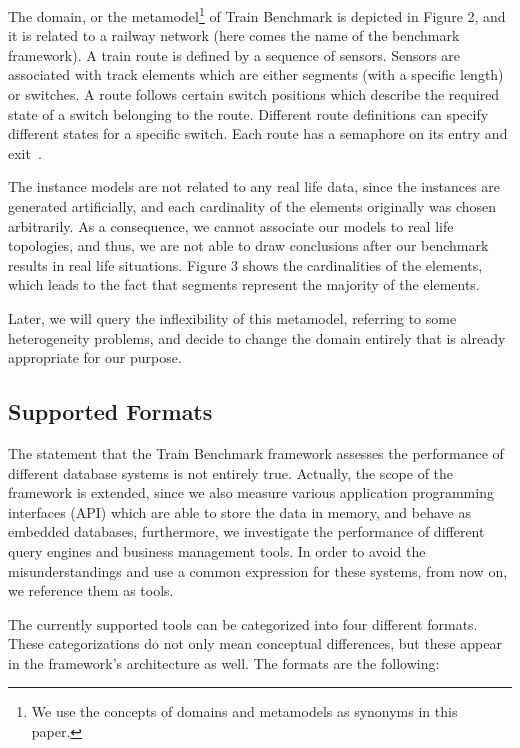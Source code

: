 The domain, or the metamodel\footnote{We use the concepts of domains and metamodels as synonyms in this paper.} of Train Benchmark is depicted in Figure 2, and it is related to a railway network (here comes the name of the benchmark framework). A train route is defined by a sequence of sensors. Sensors are associated with track elements which are either segments (with a specific length) or
switches. A route follows certain switch positions which describe the required state of a switch belonging
to the route. Different route definitions can specify different states for a specific switch. Each route has
a semaphore on its entry and exit~\cite{train_ttc}.

The instance models are not related to any real life data, since the instances are generated artificially, and each cardinality of the elements originally was chosen arbitrarily. As a consequence, we cannot associate our models to real life topologies, and thus, we are not able to draw conclusions after our benchmark results in real life situations. Figure 3 shows the cardinalities of the elements, which leads to the fact that segments represent the majority of the elements.

Later, we will query the inflexibility of this metamodel, referring to some heterogeneity problems, and decide to change the domain entirely that is already appropriate for our purpose.

\subsection{Supported Formats}

The statement that the Train Benchmark framework assesses the performance of different database systems is not entirely true. Actually, the scope of the framework is extended, since we also measure various application programming interfaces (API) which are able to store the data in memory, and behave as embedded databases, furthermore, we investigate the performance of different query engines and business management tools. In order to avoid the misunderstandings and use a common expression for these systems, from now on, we reference them as \textsf{tools}.

The currently supported tools can be categorized into four different formats. These categorizations do not only mean conceptual differences, but these appear in the framework's architecture as well. The formats are the following:

